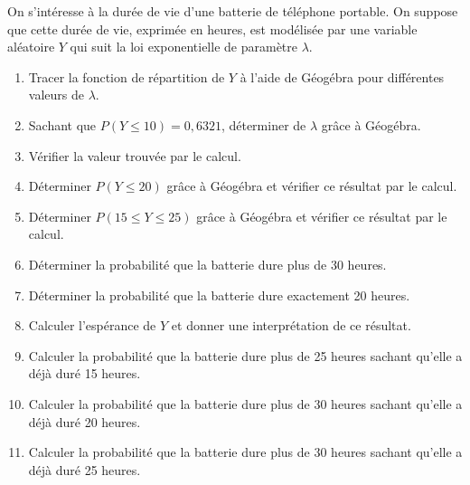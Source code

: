 \begin{exercice_cours}[\quad]{}

	On s'intéresse à la durée de vie d'une batterie de téléphone portable. On suppose que cette durée de vie, exprimée en heures, est modélisée par une variable aléatoire $Y$ qui suit la loi exponentielle de paramètre $\lambda$.

	\begin{enumerate}
		\item Tracer la fonction de répartition de $Y$ à l'aide de Géogébra pour différentes valeurs de $\lambda$.
		\item Sachant que $P(Y\leqslant 10)=0,6321$, déterminer de $\lambda$ grâce à Géogébra.
		\item Vérifier la valeur trouvée par le calcul.
		\item Déterminer $P(Y\leqslant 20)$ grâce à Géogébra et vérifier ce résultat par le calcul.
		\item Déterminer $P(15\leqslant Y\leqslant 25)$ grâce à Géogébra et vérifier ce résultat par le calcul.
		\item Déterminer la probabilité que la batterie dure plus de 30 heures.
		\item Déterminer la probabilité que la batterie dure exactement 20 heures.
		\item Calculer l'espérance de $Y$ et donner une interprétation de ce résultat.
		\item Calculer la probabilité que la batterie dure plus de 25 heures sachant qu'elle a déjà duré 15 heures.
		\item Calculer la probabilité que la batterie dure plus de 30 heures sachant qu'elle a déjà duré 20 heures.
		\item Calculer la probabilité que la batterie dure plus de 30 heures sachant qu'elle a déjà duré 25 heures.
	\end{enumerate}
	\end{exercice_cours}


